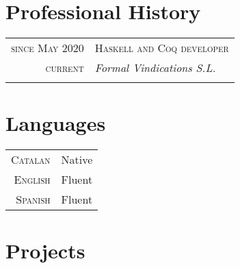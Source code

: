 \documentclass[a4paper,11pt]{article}
\begin{document}
\section{Professional History}
\vspace{0.2cm}
\begin{tabular}{r|p{11cm}}
  \textsc{since May 2020} & \textsc{Haskell and Coq developer} \\
  \textsc{current} & \emph{Formal Vindications S.L.} \\
  \multicolumn{2}{c}{} \\

\end{tabular}

\section{Languages}

\begin{tabular}{rl}
  \textsc{Catalan} & Native \\
  \textsc{English} & Fluent \\
  \textsc{Spanish} & Fluent \\
\end{tabular}


\newpage
\section{Projects}
\end{document}
